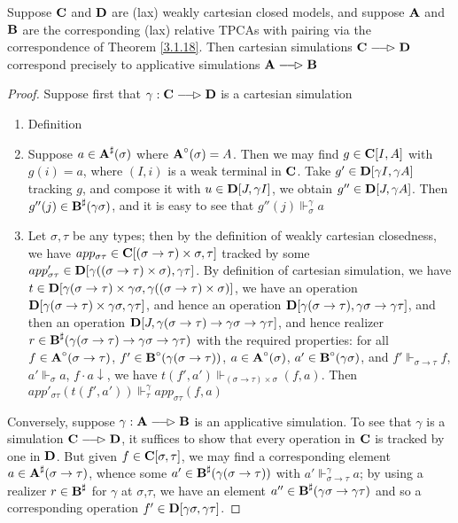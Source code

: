 \documentclass[11pt]{article}
\begin{document}
\begin{theorem}[]
Suppose \(\operatorname{\textbf{C}}\) and \(\operatorname{\textbf{D}}\) are (lax) weakly cartesian closed models, and suppose \(\operatorname{\textbf{A}}\) and \(\operatorname{\textbf{B}}\)
are the corresponding (lax) relative TPCAs with pairing via the correspondence of Theorem
\ref{3.1.18}. Then cartesian simulations \(\bC\lrarhd\bD\) correspond precisely to applicative
simulations \(\bA\lrarhd\bB\)
\end{theorem}

\begin{proof}
Suppose first that \(\gamma:\bC\lrarhd\bD\) is a cartesian simulation
\begin{enumerate}
\item Definition
\item Suppose \(a\in\operatorname{\textbf{A}}^\sharp(\sigma)\) where \(\operatorname{\textbf{A}}^\circ(\sigma)=A\). Then we may
find \(g\in\operatorname{\textbf{C}}[I,A]\) with \(g(i)=a\), where \((I,i)\) is a weak terminal in \(\operatorname{\textbf{C}}\).
Take \(g'\in\operatorname{\textbf{D}}[\gamma I,\gamma A]\) tracking \(g\), and compose it with \(u\in\operatorname{\textbf{D}}[J,\gamma I]\), we
obtain \(g''\in\operatorname{\textbf{D}}[J,\gamma A]\). Then \(g''(j)\in\operatorname{\textbf{B}}^\sharp(\gamma\sigma)\), and it is easy to see
that \(g''(j)\Vdash_\sigma^\gamma a\)
\item Let \(\sigma,\tau\) be any types; then by the definition of weakly cartesian closedness, we
have \(app_{\sigma\tau}\in\operatorname{\textbf{C}}[(\sigma\to\tau)\times\sigma,\tau]\) tracked by some \(app_{\sigma\tau}'\in\operatorname{\textbf{D}}[\gamma((\sigma\to\tau)\times\sigma),\gamma\tau]\). By definition
of cartesian simulation, we have \(t\in\operatorname{\textbf{D}}[\gamma(\sigma\to\tau)\times\gamma\sigma,\gamma((\sigma\to\tau)\times\sigma)]\), we have an operation
\(\operatorname{\textbf{D}}[\gamma(\sigma\to\tau)\times\gamma\sigma,\gamma\tau]\), and hence an operation \(\operatorname{\textbf{D}}[\gamma(\sigma\to\tau),\gamma\sigma\to\gamma\tau]\), and then
an operation \(\operatorname{\textbf{D}}[J, \gamma(\sigma\to\tau)\to\gamma\sigma\to\gamma\tau]\), and hence
realizer \(r\in\operatorname{\textbf{B}}^\sharp(\gamma(\sigma\to\tau)\to\gamma\sigma\to\gamma\tau)\) with the required properties:
for all \(f\in\operatorname{\textbf{A}}^\circ(\sigma\to\tau)\), \(f'\in\operatorname{\textbf{B}}^\circ(\gamma(\sigma\to\tau))\), \(a\in\operatorname{\textbf{A}}^\circ(\sigma)\), \(a'\in\operatorname{\textbf{B}}^\circ(\gamma\sigma)\),
and \(f'\Vdash_{\sigma\to\tau}f\), \(a'\Vdash_\sigma a\), \(f\cdot a\downarrow\), we
have \(t(f',a')\Vdash_{(\sigma\to\tau)\times\sigma}(f,a)\).
Then \(app'_{\sigma\tau}(t(f',a'))\Vdash_{\tau}^\gamma app_{\sigma\tau}(f,a)\)
\end{enumerate}


Conversely, suppose \(\gamma:\bA\lrarhd\bB\) is an applicative simulation. To see that \(\gamma\) is a
simulation \(\bC\lrarhd\bD\), it suffices to show that every operation in \(\operatorname{\textbf{C}}\) is tracked by one
in \(\operatorname{\textbf{D}}\). But given \(f\in\operatorname{\textbf{C}}[\sigma,\tau]\), we may find a corresponding element \(a\in\operatorname{\textbf{A}}^\sharp(\sigma\to\tau)\), whence
some \(a'\in\operatorname{\textbf{B}}^\sharp(\gamma(\sigma\to\tau))\) with \(a'\Vdash^\gamma_{\sigma\to\tau}a\); by using a realizer \(r\in\operatorname{\textbf{B}}^\sharp\) for \(\gamma\) at \(\sigma\),\(\tau\),
we have an element \(a''\in\operatorname{\textbf{B}}^\sharp(\gamma\sigma\to\gamma\tau)\)  and so a corresponding operation \(f'\in\operatorname{\textbf{D}}[\gamma\sigma,\gamma\tau]\).


\end{proof}
\end{document}
